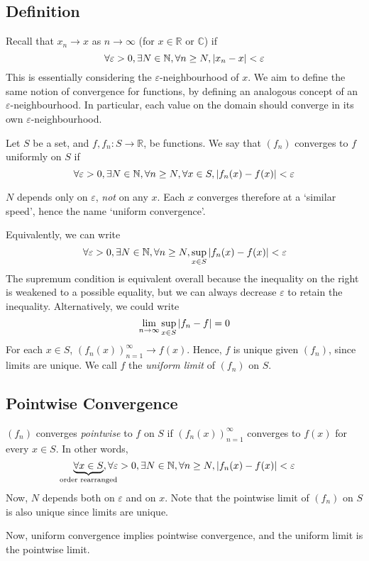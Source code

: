 \subsection{Definition}
Recall that \( x_n \to x \) as \( n \to \infty \) (for \( x \in \mathbb R\) or \(\mathbb C\)) if
\[
	\forall \varepsilon > 0, \exists N \in \mathbb N, \forall n \geq N, \abs{x_n-x} < \varepsilon
\]
This is essentially considering the \( \varepsilon \)-neighbourhood of \( x \).
We aim to define the same notion of convergence for functions, by defining an analogous concept of an \( \varepsilon \)-neighbourhood.
In particular, each value on the domain should converge in its own \( \varepsilon \)-neighbourhood.
\begin{definition}
	Let \( S \) be a set, and \( f, f_n \colon S \to \mathbb R \), be functions.
	We say that \( (f_n) \) converges to \( f \) uniformly on \( S \) if
	\[
		\forall \varepsilon > 0, \exists N \in \mathbb N, \forall n \geq N, \forall x \in S, \abs{f_n(x) - f(x)} < \varepsilon
	\]
\end{definition}
\begin{note}
	\( N \) depends only on \( \varepsilon \), \textit{not} on any \( x \).
	Each \( x \) converges therefore at a `similar speed', hence the name `uniform convergence'.
\end{note}
Equivalently, we can write
\[
	\forall \varepsilon > 0, \exists N \in \mathbb N, \forall n \geq N, \sup_{x \in S} \abs{f_n(x) - f(x)} < \varepsilon
\]
The supremum condition is equivalent overall because the inequality on the right is weakened to a possible equality, but we can always decrease \( \varepsilon \) to retain the inequality.
Alternatively, we could write
\[
	\lim_{n \to \infty} \sup_{x \in S} \abs{f_n - f} = 0
\]
For each \( x \in S \), \( (f_n(x))_{n=1}^\infty \to f(x) \).
Hence, \( f \) is unique given \( (f_n) \), since limits are unique.
We call \( f \) the \textit{uniform limit} of \( (f_n) \) on \( S \).

\subsection{Pointwise Convergence}
\begin{definition}
	\( (f_n) \) converges \textit{pointwise} to \( f \) on \( S \) if \( (f_n(x))_{n=1}^\infty \) converges to \( f(x) \) for every \( x \in S \).
	In other words,
	\[
		\underbrace{\forall x \in S}_{\mathclap{\text{order rearranged}}}, \forall \varepsilon > 0, \exists N \in \mathbb N, \forall n \geq N, \abs{f_n(x) - f(x)} < \varepsilon
	\]
	Now, \( N \) depends both on \( \varepsilon \) and on \( x \).
	Note that the pointwise limit of \( (f_n) \) on \( S \) is also unique since limits are unique.
\end{definition}
Now, uniform convergence implies pointwise convergence, and the uniform limit is the pointwise limit.

